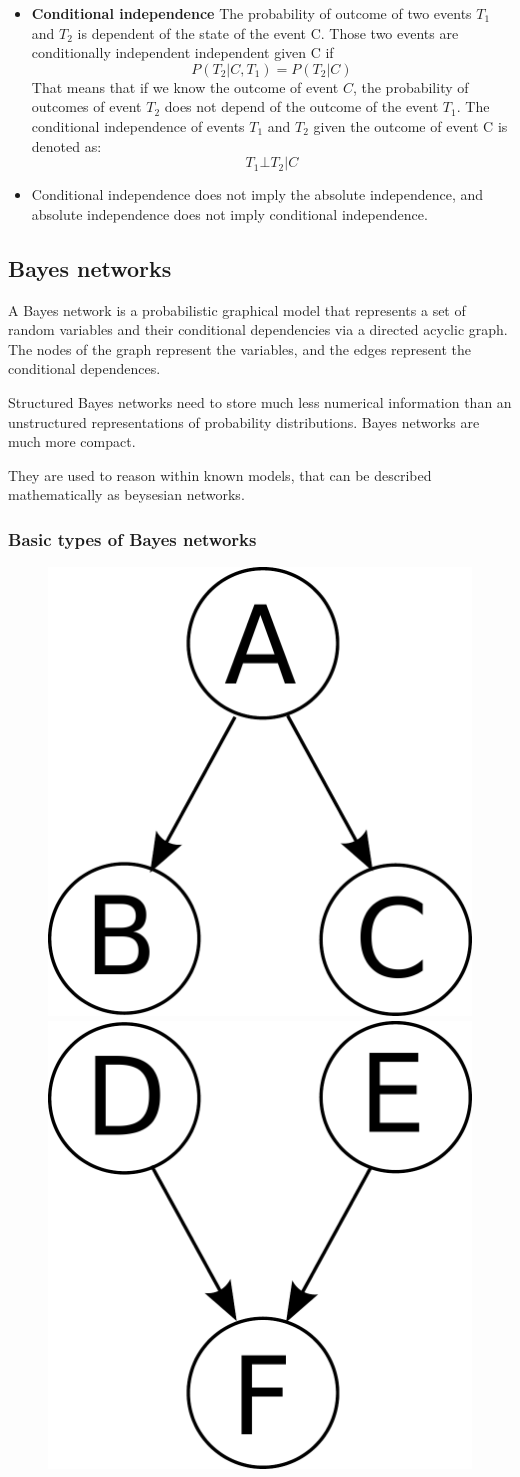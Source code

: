 \documentclass[a4paper,10pt]{article}
\begin{document}
\begin{itemize}
\item \textbf{Conditional independence} The probability of outcome of two events $T_1$ and $T_2$ is dependent of the state of the event C. Those two events are conditionally independent independent given C if
\[ P(T_2|C,T_1)=P(T_2|C) \]
That means that if we know the outcome of event $C$, the probability of outcomes of event $T_2$ does not depend of the outcome of the event $T_1$. The conditional independence of events $T_1$ and $T_2$ given the outcome of event C is denoted as:
\[T_1 \bot T_2 | C \]
\item Conditional independence does not imply the absolute independence, and absolute independence does not imply conditional independence.

\end{itemize}

\subsection{Bayes networks}

A Bayes network is a probabilistic graphical model that represents a set of random variables and their conditional dependencies via a directed acyclic graph. The nodes of the graph represent the variables, and the edges represent the conditional dependences. 

Structured Bayes networks need to store much less numerical information than an unstructured representations of probability distributions. Bayes networks are much more compact.

They are used to reason within known models, that can be described mathematically as beysesian networks.

\subsubsection{Basic types of Bayes networks}

\begin{figure}[h!]
\centering
\includegraphics[height=0.2\textwidth]{Bayes1.pdf} \hspace{2em}
\includegraphics[height=0.2\textwidth]{Bayes2.pdf}
\end{figure}
\end{document}

